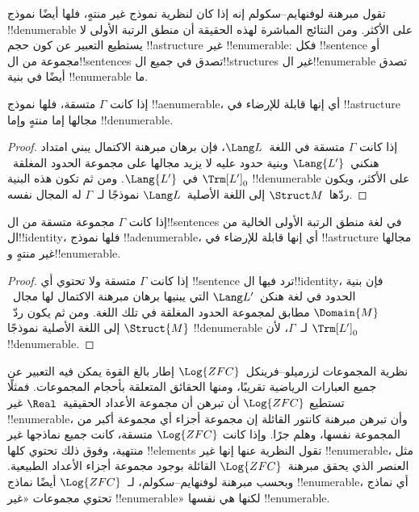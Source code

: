 \documentclass[../../../include/open-logic-section]{subfiles}
\begin{document}

تقول مبرهنة لوفنهايم--سكولم إنه إذا كان لنظرية نموذج غير منتهٍ، فلها
أيضًا نموذج !!{denumerable} على الأكثر. ومن النتائج المباشرة لهذه
الحقيقة أن منطق الرتبة الأولى لا يستطيع التعبير عن كون حجم
!!a{structure} غير !!{enumerable}: فكل !!{sentence} أو مجموعة من
ال!!{sentence}s تصدق في جميع ال!!{structure}s غير ال!!{enumerable} تصدق
أيضًا في بنية !!{enumerable} ما.

\begin{thm}
 إذا كانت $\Gamma$ متسقة، فلها نموذج
!!a{enumerable}، أي إنها قابلة للإرضاء في !!a{structure} مجالها إما
منتهٍ وإما !!{denumerable}.
\end{thm}

\begin{proof}
إذا كانت $\Gamma$ متسقة في اللغة~$\Lang L$، فإن برهان مبرهنة الاكتمال
يبني امتداد هنكني~$\Lang{L'}$ وبنية حدود عليه لا يزيد مجالها على مجموعة
الحدود المغلقة~$\Trm[L']_0$ في~$\Lang{L'}$. ومن ثم تكون هذه البنية
!!{denumerable} على الأكثر، ويكون ردّها~$\Struct M$ إلى اللغة
الأصلية~$\Lang L$ نموذجًا لـ~$\Gamma$ له المجال نفسه.
\end{proof}

\begin{thm}
 إذا كانت $\Gamma$ مجموعة متسقة من ال!!{sentence}s
في لغة منطق الرتبة الأولى الخالية من ال!!{identity}، فلها نموذج
!!a{denumerable}، أي إنها قابلة للإرضاء في !!a{structure} مجالها غير
منتهٍ و!!{enumerable}.
\end{thm}

\begin{proof}
إذا كانت $\Gamma$ متسقة ولا تحتوي أي !!{sentence} ترد فيها ال!!{identity}،
فإن بنية الحدود في لغة هنكن~$\Lang L'$ التي يبنيها برهان مبرهنة
الاكتمال لها مجال~$\Domain{M}$ مطابق لمجموعة الحدود المغلقة في تلك
اللغة. ومن ثم يكون ردّ~$\Struct{M}$ إلى اللغة الأصلية نموذجًا
!!{denumerable} لـ~$\Gamma$، لأن $\Trm[L']_0$ !!{denumerable}.
\end{proof}

\begin{ex}
نظرية المجموعات لزرميلو--فرينكل~$\Log{ZFC}$ إطار بالغ القوة يمكن فيه
التعبير عن جميع العبارات الرياضية تقريبًا، ومنها الحقائق المتعلقة
بأحجام المجموعات. فمثلًا تستطيع $\Log{ZFC}$ أن تبرهن أن مجموعة الأعداد
الحقيقية~$\Real$ غير !!{enumerable}، وأن تبرهن مبرهنة كانتور القائلة إن
مجموعة أجزاء أي مجموعة أكبر من المجموعة نفسها، وهلم جرًا. وإذا كانت
$\Log{ZFC}$ متسقة، كانت جميع نماذجها غير منتهية، وفوق ذلك تحتوي كلها
!!{element}s تقول النظرية عنها إنها غير !!{enumerable}، مثل العنصر الذي
يحقق مبرهنة~$\Log{ZFC}$ القائلة بوجود مجموعة أجزاء الأعداد الطبيعية.
وبحسب مبرهنة لوفنهايم--سكولم، لـ~$\Log{ZFC}$ أيضًا نماذج
!!{enumerable}، أي نماذج تحتوي مجموعات «غير !!{enumerable}» لكنها هي
نفسها !!{enumerable}.
\end{ex}
\end{document}
